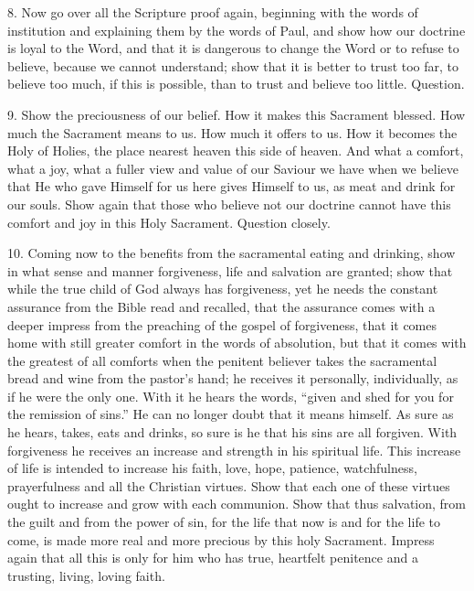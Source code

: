 8. Now go over all the Scripture proof again, beginning with the words of institution and explaining them by the words of Paul, and show how our doctrine is loyal to the Word, and that it is dangerous to change the Word or to refuse to believe, because we cannot understand; show that it is better to trust too far, to believe too much, if this is possible, than to trust and believe too little. Question. 

9. Show the preciousness of our belief. How it makes this Sacrament blessed. How much the Sacrament means to us. How much it offers to us. How it becomes the Holy of Holies, the place nearest heaven this side of heaven. And what a comfort, what a joy, what a fuller view and value of our Saviour we have when we believe that He who gave Himself for us here gives Himself to us, as meat and drink for our souls. Show again that those who believe not our doctrine cannot have this comfort and joy in this Holy Sacrament. Question closely. 

10. Coming now to the benefits from the sacramental eating and drinking, show in what sense and manner forgiveness, life and salvation are granted; show that while the true child of God always has forgiveness, yet he needs the constant assurance
from the Bible read and recalled, that the assurance comes with a deeper impress from the preaching of the gospel of forgiveness, that it comes home with still greater comfort in the words of absolution, but that it comes with the greatest of all comforts when the penitent believer takes the sacramental bread and wine from the pastor’s hand; he receives it personally, individually, as if he were the only one. With it he hears the words, “given and shed for you for the remission of sins.” He can no longer doubt that it means himself. As sure as he hears, takes, eats and drinks, so sure is he that his sins are all forgiven. With forgiveness he receives an increase and strength in his spiritual life. This increase of life is intended to increase his faith, love, hope, patience, watchfulness, prayerfulness and all the Christian virtues. Show that each one of these virtues ought to increase and grow with each communion. Show that thus salvation, from the guilt and from the power of sin, for the life that now is and for the life to come, is made more real and more precious by this holy Sacrament. Impress again that all this is only for him who has true, heartfelt penitence and a trusting, living, loving faith.

